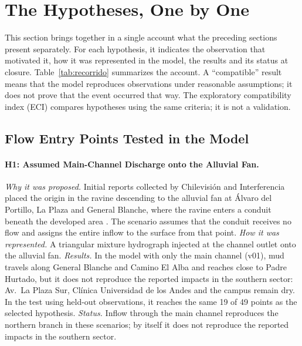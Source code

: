 \section{The Hypotheses, One by One}\label{sec:recorrido}
This section brings together in a single account what the preceding sections present separately. For each hypothesis, it indicates the observation that motivated it, how it was represented in the model, the results and its status at closure. Table~\ref{tab:recorrido} summarizes the account. A ``compatible'' result means that the model reproduces observations under reasonable assumptions; it does not prove that the event occurred that way. The exploratory compatibility index (ECI) compares hypotheses using the same criteria; it is not a validation.

\subsection{Flow Entry Points Tested in the Model}
\paragraph{H1: Assumed Main-Channel Discharge onto the Alluvial Fan.} \emph{Why it was proposed.} Initial reports collected by Chilevisión and Interferencia placed the origin in the ravine descending to the alluvial fan at Álvaro del Portillo, La Plaza and General Blanche, where the ravine enters a conduit beneath the developed area \citep{chilevision2026,interferencia2026}. The scenario assumes that the conduit receives no flow and assigns the entire inflow to the surface from that point. \emph{How it was represented.} A triangular mixture hydrograph injected at the channel outlet onto the alluvial fan. \emph{Results.} In the model with only the main channel (v01), mud travels along General Blanche and Camino El Alba and reaches close to Padre Hurtado, but it does not reproduce the reported impacts in the southern sector: Av.\ La Plaza Sur, Clínica Universidad de los Andes and the campus remain dry. In the test using held-out observations, it reaches the same 19 of 49 points as the selected hypothesis. \emph{Status.} Inflow through the main channel reproduces the northern branch in these scenarios; by itself it does not reproduce the reported impacts in the southern sector.

